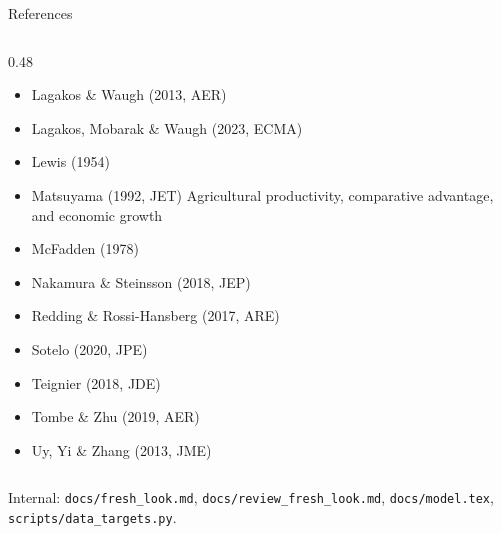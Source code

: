 \documentclass[10pt,aspectratio=169]{beamer}
\begin{document}
\begin{frame}{References}
\begin{columns}[T]
\begin{column}{0.48\textwidth}
\begin{itemize}
      \item Lagakos \& Waugh (2013, AER)
      \item Lagakos, Mobarak \& Waugh (2023, ECMA)
      \item Lewis (1954)
      \item Matsuyama (1992, JET) Agricultural productivity, comparative advantage, and economic growth
      \item McFadden (1978)
      \item Nakamura \& Steinsson (2018, JEP)
      \item Redding \& Rossi-Hansberg (2017, ARE)
      \item Sotelo (2020, JPE)
      \item Teignier (2018, JDE)
      \item Tombe \& Zhu (2019, AER)
      \item Uy, Yi \& Zhang (2013, JME)
    \end{itemize}
    \end{column}
  \end{columns}
  \vfill
  \scriptsize Internal: \texttt{docs/fresh\_look.md}, \texttt{docs/review\_fresh\_look.md},
  \texttt{docs/model.tex}, \texttt{scripts/data\_targets.py}.
\end{frame}
\end{document}
